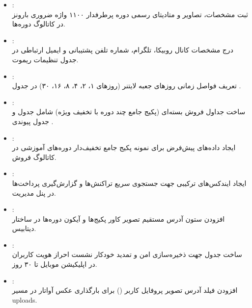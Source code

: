 \documentclass[11pt,a4paper]{article}
\begin{document}
\begin{itemize}[leftmargin=0.8cm]
    \item \textbf{}:\\
    ثبت مشخصات، تصاویر و متادیتای رسمی دوره پرطرفدار ۱۱۰۰ واژه ضروری بارونز در کاتالوگ دوره‌ها.

    \item \textbf{}:\\
    درج مشخصات کانال روبیکا، تلگرام، شماره تلفن پشتیبانی و ایمیل ارتباطی در جدول تنظیمات ریموت.

    \item \textbf{}:\\
    تعریف فواصل زمانی روزهای جعبه لایتنر (روزهای ۱، ۲، ۴، ۸، ۱۶، ۳۰) در جدول .

    \item \textbf{}:\\
    ساخت جداول فروش بسته‌ای (پکیج جامع چند دوره با تخفیف ویژه) شامل جدول  و جدول پیوندی .

    \item \textbf{}:\\
    ایجاد داده‌های پیش‌فرض برای نمونه پکیج جامع تخفیف‌دار دوره‌های آموزشی در کاتالوگ فروش.

    \item \textbf{}:\\
    ایجاد ایندکس‌های ترکیبی جهت جستجوی سریع تراکنش‌ها و گزارش‌گیری پرداخت‌ها در پنل مدیریت.

    \item \textbf{}:\\
    افزودن ستون آدرس مستقیم تصویر کاور پکیج‌ها و آیکون دوره‌ها در ساختار دیتابیس.

    \item \textbf{}:\\
    ساخت جدول  جهت ذخیره‌سازی امن و تمدید خودکار نشست احراز هویت کاربران در اپلیکیشن موبایل تا ۳۰ روز.

    \item \textbf{}:\\
    افزودن فیلد آدرس تصویر پروفایل کاربر () برای بارگذاری عکس آواتار در مسیر uploads.
\end{itemize}
\end{document}
